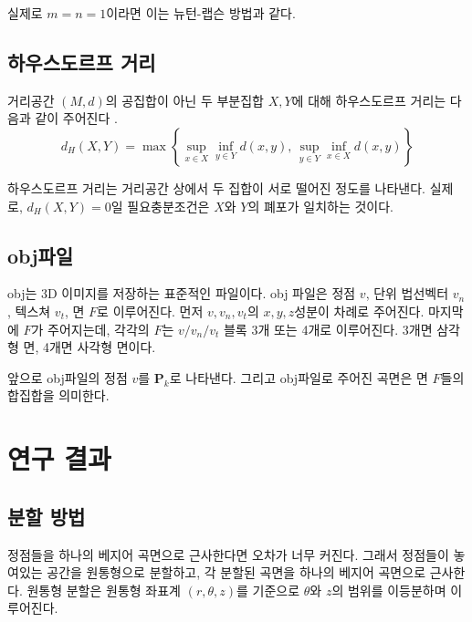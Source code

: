 \documentclass{Humantech_Paper_Awardfullpaper_hutech}
\begin{document}
실제로 $m = n = 1$이라면 이는 뉴턴-랩슨 방법과 같다.

\subsection{하우스도르프 거리}
\begin{defn}
	거리공간 $(M, d)$의 공집합이 아닌 두 부분집합 $X, Y$에 대해 하우스도르프 거리는 다음과 같이 주어진다 \cite{Munkres}.
	\begin{equation} \label{hausdorffdistance}
		d_H(X, Y) = \max \left\{ \sup_{x \in X} \inf_{y \in Y} d(x, y), \, \sup_{y \in Y} \inf_{x \in X} d(x, y) \right\}
	\end{equation}
\end{defn}

하우스도르프 거리는 거리공간 상에서 두 집합이 서로 떨어진 정도를 나타낸다. 실제로, $d_H(X, Y) = 0$일 필요충분조건은 $X$와 $Y$의 폐포가 일치하는 것이다. 

\subsection{obj파일}
obj는 3D 이미지를 저장하는 표준적인 파일이다. obj 파일은 정점 $v$, 단위 법선벡터 $v_n$, 텍스쳐 $v_t$, 면 $F$로 이루어진다. 먼저 $v, v_n, v_t$의 $x, y, z$성분이 차례로 주어진다. 마지막에 $F$가 주어지는데, 각각의 $F$는 $v / v_n / v_t$ 블록 3개 또는 4개로 이루어진다. 3개면 삼각형 면, 4개면 사각형 면이다. 

앞으로 obj파일의 정점 $v$를 $\mathbf{P}_k$로 나타낸다. 그리고 obj파일로 주어진 곡면은 면 $F$들의 합집합을 의미한다. 

\section{연구 결과}
\subsection{분할 방법}
정점들을 하나의 베지어 곡면으로 근사한다면 오차가 너무 커진다. 그래서 정점들이 놓여있는 공간을 원통형으로 분할하고, 각 분할된 곡면을 하나의 베지어 곡면으로 근사한다. 원통형 분할은 원통형 좌표계 $(r, \theta, z)$를 기준으로 $\theta$와 $z$의 범위를 이등분하며 이루어진다. 
\end{document}
